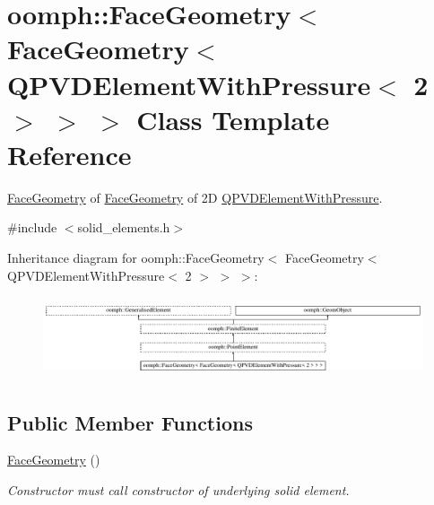 \hypertarget{classoomph_1_1FaceGeometry_3_01FaceGeometry_3_01QPVDElementWithPressure_3_012_01_4_01_4_01_4}{}\section{oomph\+:\+:Face\+Geometry$<$ Face\+Geometry$<$ Q\+P\+V\+D\+Element\+With\+Pressure$<$ 2 $>$ $>$ $>$ Class Template Reference}
\label{classoomph_1_1FaceGeometry_3_01FaceGeometry_3_01QPVDElementWithPressure_3_012_01_4_01_4_01_4}


\hyperlink{classoomph_1_1FaceGeometry}{Face\+Geometry} of \hyperlink{classoomph_1_1FaceGeometry}{Face\+Geometry} of 2D \hyperlink{classoomph_1_1QPVDElementWithPressure}{Q\+P\+V\+D\+Element\+With\+Pressure}.  




{\ttfamily \#include $<$solid\+\_\+elements.\+h$>$}

Inheritance diagram for oomph\+:\+:Face\+Geometry$<$ Face\+Geometry$<$ Q\+P\+V\+D\+Element\+With\+Pressure$<$ 2 $>$ $>$ $>$\+:\begin{figure}[H]
\begin{center}
\leavevmode
\includegraphics[height=2.419007cm]{classoomph_1_1FaceGeometry_3_01FaceGeometry_3_01QPVDElementWithPressure_3_012_01_4_01_4_01_4}
\end{center}
\end{figure}
\subsection*{Public Member Functions}
\begin{DoxyCompactItemize}
\item 
\hyperlink{classoomph_1_1FaceGeometry_3_01FaceGeometry_3_01QPVDElementWithPressure_3_012_01_4_01_4_01_4_a341fed8604bba1192d7448518741cf1d}{Face\+Geometry} ()
\begin{DoxyCompactList}\small\item\em Constructor must call constructor of underlying solid element. \end{DoxyCompactList}\end{DoxyCompactItemize}
